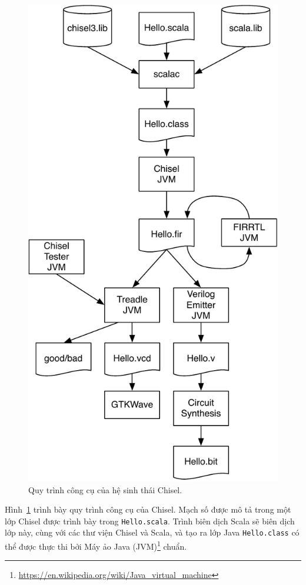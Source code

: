 \documentclass[%
    10pt,
    headinclude, footexclude,
    openright, %
    notitlepage,
    cleardoubleempty,
    headsepline,
    pointlessnumbers,
    bibtotoc, idxtotoc,
    ]{scrbook}
\newcommand{\code}[1]{{\small{\texttt{#1}}}}
\newcommand{\scale}{0.7}
\newcommand{\myref}[2]{\href{#1}{#2}}
\renewcommand{\myref}[2]{{#2}{\footnote{\url{#1}}}}
\begin{document}
\begin{figure}
  \centering
  \includegraphics[scale=\scale]{figures/flow}
  \caption{Quy trình công cụ của hệ sinh thái Chisel.}
  \label{fig:flow}
\end{figure}

Hình~\ref{fig:flow} trình bày quy trình công cụ của Chisel. Mạch số được mô tả trong một lớp Chisel
được trình bày trong \code{Hello.scala}. Trình biên dịch Scala sẽ biên dịch lớp này, cùng với các thư viện Chisel và Scala,
và tạo ra lớp Java \code{Hello.class} có thể được thực thi bởi 
\myref{https://en.wikipedia.org/wiki/Java_virtual_machine}{Máy ảo Java (JVM)} chuẩn.
\end{document}
